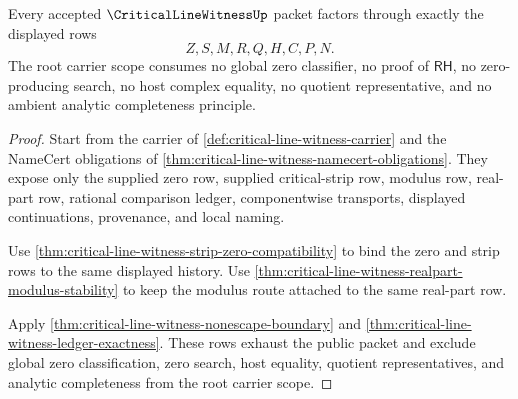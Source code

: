 \begin{theorem}
\label{thm:critical-line-witness-root-carrier-scope}
Every accepted $\CriticalLineWitnessUp$ packet factors through exactly the displayed rows
$$
Z,S,M,R,Q,H,C,P,N.
$$
The root carrier scope consumes no global zero classifier, no proof of $\mathsf{RH}$, no zero-producing search, no host complex equality, no quotient representative, and no ambient analytic completeness principle.
\end{theorem}
\begin{proof}
Start from the carrier of \autoref{def:critical-line-witness-carrier} and the NameCert obligations of \autoref{thm:critical-line-witness-namecert-obligations}. They expose only the supplied zero row, supplied critical-strip row, modulus row, real-part row, rational comparison ledger, componentwise transports, displayed continuations, provenance, and local naming.

Use \autoref{thm:critical-line-witness-strip-zero-compatibility} to bind the zero and strip rows to the same displayed history. Use \autoref{thm:critical-line-witness-realpart-modulus-stability} to keep the modulus route attached to the same real-part row.

Apply \autoref{thm:critical-line-witness-nonescape-boundary} and \autoref{thm:critical-line-witness-ledger-exactness}. These rows exhaust the public packet and exclude global zero classification, zero search, host equality, quotient representatives, and analytic completeness from the root carrier scope.
\end{proof}

